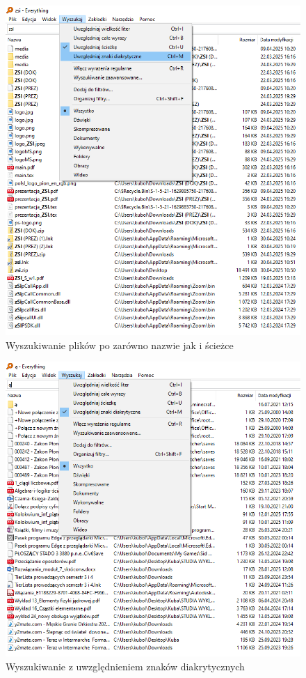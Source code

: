 \documentclass[0.82pt,a4paper]{article}
\begin{document}
    \begin{figure}[H]
        \centering
        \includegraphics[width=0.8\linewidth]{media/EverythingTool/ev3.png}
        \caption[everything filtr sciezka]{Wyszukiwanie plików po zarówno nazwie jak i ścieżce}
        \label{fig:ev_sciezka}
    \end{figure}

    \begin{figure}[H]
        \centering
        \includegraphics[width=0.8\linewidth]{media/EverythingTool/ev4.png}
        \caption[everything znaki diakrytyczne]{Wyszukiwanie z uwzględnieniem znaków diakrytycznych}
        \label{fig:ev_diakr}
    \end{figure}
\end{document}

